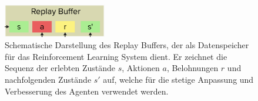 \begin{figure}[htbp]
\centering
\includegraphics[width=0.4\textwidth]{3Experiment/2Experiment/0Replay_Buffer_short.png}
\caption{Schematische Darstellung des Replay Buffers, der als Datenspeicher für das Reinforcement Learning System dient. Er zeichnet die Sequenz der erlebten Zustände \( s \), Aktionen \( a \), Belohnungen \( r \) und nachfolgenden Zustände \( s' \) auf, welche für die stetige Anpassung und Verbesserung des Agenten verwendet werden.}
\label{fig:replay_buffer}
\end{figure}








% 




